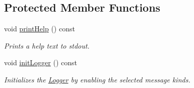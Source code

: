 \subsection*{Protected Member Functions}
\begin{DoxyCompactItemize}
\item 
void \hyperlink{classOptions_a9fb71bc356f663be2346fb73806aed6b}{print\-Help} () const 
\begin{DoxyCompactList}\small\item\em Prints a help text to stdout. \end{DoxyCompactList}\item 
void \hyperlink{classOptions_a4747e24243c28fcff14f23a9c4f8eecf}{init\-Logger} () const 
\begin{DoxyCompactList}\small\item\em Initializes the \hyperlink{classLogger}{Logger} by enabling the selected message kinds. \end{DoxyCompactList}\end{DoxyCompactItemize}

